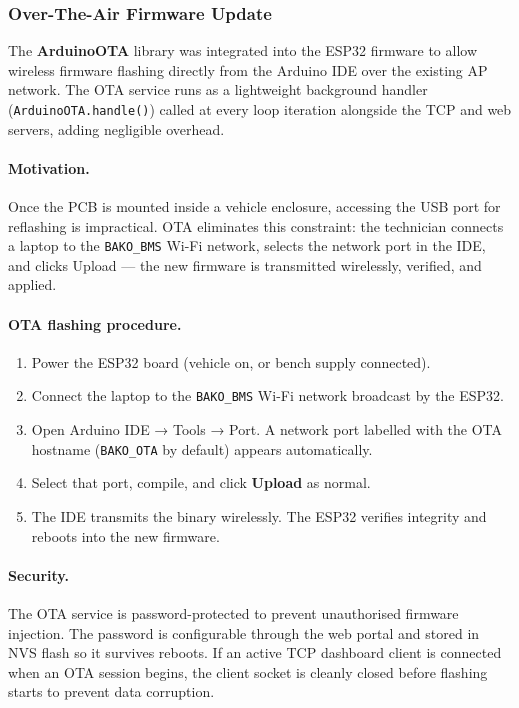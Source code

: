 \subsubsection*{Over-The-Air Firmware Update}

The \textbf{ArduinoOTA} library was integrated into the ESP32 firmware to allow wireless firmware flashing directly from the Arduino IDE over the existing AP network. The OTA service runs as a lightweight background handler (\texttt{ArduinoOTA.handle()}) called at every loop iteration alongside the TCP and web servers, adding negligible overhead.

\paragraph{Motivation.}
Once the PCB is mounted inside a vehicle enclosure, accessing the USB port for reflashing is impractical. OTA eliminates this constraint: the technician connects a laptop to the \texttt{BAKO\_BMS} Wi-Fi network, selects the network port in the IDE, and clicks Upload — the new firmware is transmitted wirelessly, verified, and applied.

\paragraph{OTA flashing procedure.}
\begin{enumerate}
    \item Power the ESP32 board (vehicle on, or bench supply connected).
    \item Connect the laptop to the \texttt{BAKO\_BMS} Wi-Fi network broadcast by the ESP32.
    \item Open Arduino IDE → Tools → Port. A network port labelled with the OTA hostname (\texttt{BAKO\_OTA} by default) appears automatically.
    \item Select that port, compile, and click \textbf{Upload} as normal.
    \item The IDE transmits the binary wirelessly. The ESP32 verifies integrity and reboots into the new firmware.
\end{enumerate}

\paragraph{Security.}
The OTA service is password-protected to prevent unauthorised firmware injection. The password is configurable through the web portal and stored in NVS flash so it survives reboots. If an active TCP dashboard client is connected when an OTA session begins, the client socket is cleanly closed before flashing starts to prevent data corruption.


